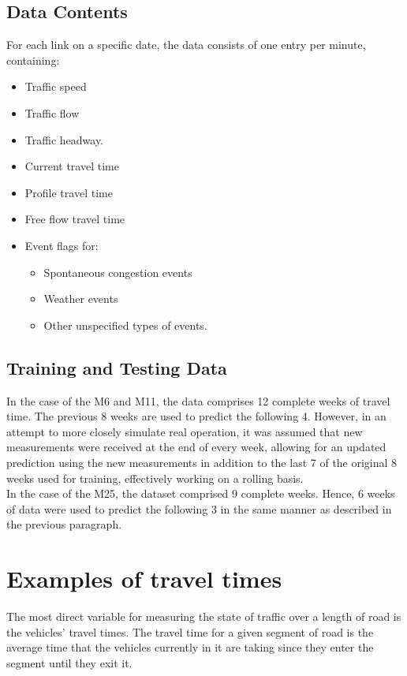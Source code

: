 \documentclass[conference]{IEEEtran}
\begin{document}
\subsection{Data Contents}
For each link on a specific date, the data consists of one entry per minute, containing:
\begin{itemize}
	\item Traffic speed
	\item Traffic flow
	\item Traffic headway.
	\item Current travel time
	\item Profile travel time 
	\item Free flow travel time
	\item Event flags for:
	\begin{itemize}
		\item Spontaneous congestion events
		\item Weather events 
		\item Other unspecified types of events.
	\end{itemize} 	
\end{itemize}

\subsection{Training and Testing Data}
In the case of the M6 and M11, the data comprises 12 complete weeks of travel time. The previous 8 weeks are used to predict the following 4. 
However, in an attempt to more closely simulate real operation, it was assumed that new measurements were received at the end of every week, allowing for an updated prediction using the new measurements in addition to the last 7 of the original 8 weeks used for training, effectively working on a rolling basis.\\
In the case of the M25, the dataset comprised 9 complete weeks. 
Hence, 6 weeks of data were used to predict the following 3 in the same manner as described in the previous paragraph.

\section{Examples of travel times} 
The most direct variable for measuring the state of traffic over a length of road is the vehicles' travel times. 
The travel time for a given segment of road is the average time that the vehicles currently in it are taking since they enter the segment until they exit it.\\
\end{document}
